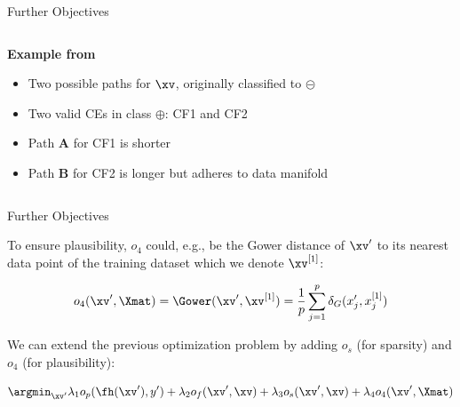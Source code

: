 \documentclass[11pt,compress,t,notes=noshow, aspectratio=169, xcolor=table, usenames,dvipsnames]{beamer}
\begin{document}
\begin{frame}{Further Objectives}
{\begin{columns}[c, totalwidth=\textwidth]
\begin{column}{0.6\textwidth}
\textbf{Example from } 
\begin{itemize}
    \item Two possible paths for \textcolor{blue}{$\xv$},			originally classified to $\pmb{\circleddash}$
    \item Two valid CEs in class $\pmb\oplus$: {\color{Red} CF1} and {\color{Green} CF2}
    \item {\color{Red} Path \textbf{A} for CF1} is shorter
    \item {\color{Green} Path \textbf{B} for CF2} is longer but adheres to data manifold
\end{itemize}
\end{column}
\end{columns}
}

\end{frame}


\begin{frame}{Further Objectives}

To ensure plausibility, $o_4$ could, e.g., be the Gower distance of $\xv'$ to its nearest data point of the training dataset which we denote $\xv^{[1]}$:
	
$$o_4(\xv', \Xmat) = \Gower(\xv', \xv^{[1]}) = \frac{1}{p} \sum_{j = 1}^{p}  \delta_G(x_j', x^{[1]}_j)$$

We can extend the previous optimization problem by adding $o_s$ (for sparsity) and $o_4$ (for plausibility):

$$\argmin_{\xv'} \lambda_1 o_p(\fh(\xv'), y') + \lambda_2 o_f(\xv', \xv) + \lambda_3 o_s(\xv', \xv) + \lambda_4 o_4(\xv', \Xmat)$$

\end{frame}
\end{document}
